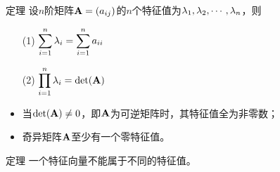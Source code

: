 \begin{frame}
  \begin{footnotesize}
    \begin{block}{定理}
      设$n$阶矩阵$\mathbf{A}=(a_{ij})$的$n$个特征值为$\lambda_1,\lambda_2,\cdots,\lambda_n$，则
      \begin{itemize}
      \item[(1)] $\displaystyle \sum_{i=1}^n\lambda_i=\sum_{i=1}^na_{ii}$
      \item[(2)] $\displaystyle \prod_{i=1}^n\lambda_i=\det(\mathbf{A})$         
      \end{itemize}
    \end{block}
 

    \begin{itemize}
    \item 当$\det(\mathbf{A})\ne 0$，即$\mathbf{A}$为可逆矩阵时，其特征值全为非零数；
    \item 奇异矩阵$\mathbf{A}$至少有一个零特征值。      
    \end{itemize}
  \end{footnotesize}
\end{frame}


 


\begin{frame}
  \begin{footnotesize}
    \begin{block}{定理}
      一个特征向量不能属于不同的特征值。
    \end{block}
    
  \end{footnotesize}
\end{frame}

